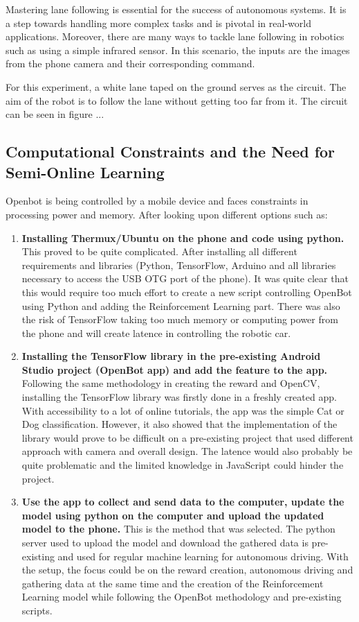 \documentclass[12pt]{report}
\begin{document}
Mastering lane following is essential for the success of autonomous systems. It is a step towards handling more complex tasks and is pivotal in real-world applications. Moreover, there are many ways to tackle lane following in robotics such as using a simple infrared sensor. In this scenario, the inputs are the images from the phone camera and their corresponding command.

For this experiment, a white lane taped on the ground serves as the circuit. The aim of the robot is to follow the lane without getting too far from it. The circuit can be seen in figure ...  

\subsection{Computational Constraints and the Need for Semi-Online Learning}
\label{sub:Computational_constraints}
Openbot is being controlled by a mobile device and faces constraints in processing power and memory. After looking upon different options such as: 
\begin{enumerate}
    \item \textbf{Installing Thermux/Ubuntu on the phone and code using python.} This proved to be quite complicated. After installing all different requirements and libraries (Python, TensorFlow, Arduino and all libraries necessary to access the USB OTG port of the phone). It was quite clear that this would require too much effort to create a new script controlling OpenBot using Python and adding the Reinforcement Learning part. There was also the risk of TensorFlow taking too much memory or computing power from the phone and will create latence in controlling the robotic car.

    \item \textbf{Installing the TensorFlow library in the pre-existing Android Studio project (OpenBot app) and add the feature to the app.} Following the same methodology in creating the reward and OpenCV, installing the TensorFlow library was firstly done in a freshly created app. With accessibility to a lot of online tutorials, the app was the simple Cat or Dog classification. However, it also showed that the implementation of the library would prove to be difficult on a pre-existing project that used different approach with camera and overall design. The latence would also probably be quite problematic and the limited knowledge in JavaScript could hinder the project.

    \item \textbf{Use the app to collect and send data to the computer, update the model using python on the computer and upload the updated model to the phone.} This is the method that was selected. The python server used to upload the model and download the gathered data is pre-existing and used for regular machine learning for autonomous driving. With the setup, the focus could be on the reward creation, autonomous driving and gathering data at the same time and the creation of the Reinforcement Learning model while following the OpenBot methodology and pre-existing scripts. 

\end{enumerate}
\end{document}
